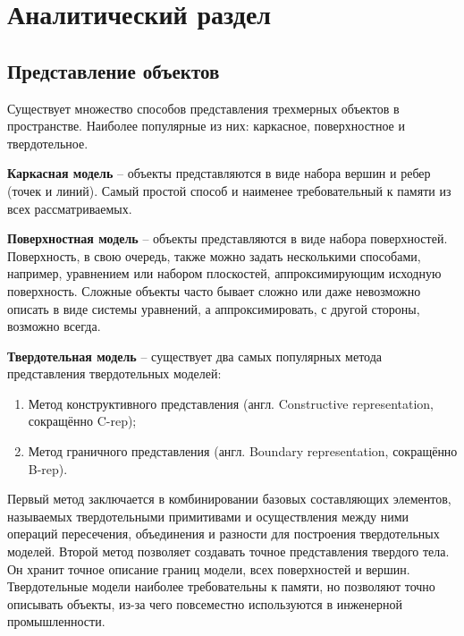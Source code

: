 



\newpage
\section{Аналитический раздел}

\subsection{Представление объектов}

Существует множество способов представления трехмерных объектов в пространстве.
Наиболее популярные из них: каркасное, поверхностное и твердотельное.

\textbf{Каркасная модель} -- объекты представляются в виде набора вершин и
ребер (точек и линий). Самый простой способ и наименее требовательный к памяти
из всех рассматриваемых.

\textbf{Поверхностная модель} -- объекты представляются в виде набора
поверхностей. Поверхность, в свою очередь, также можно задать несколькими
способами, например, уравнением или набором плоскостей, аппроксимирующим
исходную поверхность. Сложные объекты часто бывает сложно или даже невозможно
описать в виде системы уравнений, а аппроксимировать, с другой стороны,
возможно всегда. \cite{m3m}

\textbf{Твердотельная модель} -- существует два самых популярных метода
представления твердотельных моделей:
\begin{enumerate}
    \item Метод конструктивного представления (англ. Constructive representation, сокращённо C-rep);
    \item Метод граничного представления (англ. Boundary representation, сокращённо B-rep).
\end{enumerate}
Первый метод заключается в комбинировании базовых составляющих элементов,
называемых твердотельными примитивами и осуществления между ними операций
пересечения, объединения и разности для построения твердотельных моделей.
Второй метод позволяет создавать точное представления твердого тела. Он хранит
точное описание границ модели, всех поверхностей и вершин. Твердотельные модели
наиболее требовательны к памяти, но позволяют точно описывать объекты, из-за
чего повсеместно используются в инженерной промышленности. \cite{msbm}

